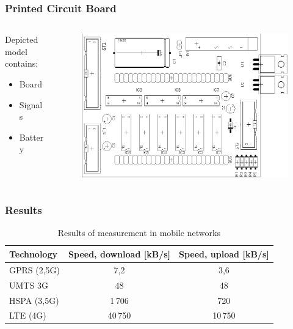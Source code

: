 \documentclass[%
  12pt,       				%
	t,                  %
	aspectratio=1610,   %
	unicode,						%
]{beamer}				    	%
\begin{document}
\begin{frame} 
	\frametitle{Printed Circuit Board}
	
	\begin{columns}[T] 								%
		\begin{column}{0.4\textwidth}		%
			Depicted model contains:\\[2ex]
			\begin{itemize}
				\item Board
				\item Signals
				\item Battery
			\end{itemize}
		\end{column}
		\begin{column}{0.6\textwidth}		%
			\begin{figure}%
				\centering
				\vspace{1cm}	              %
				\includegraphics[width=0.8\columnwidth]{pict/soucastky}
			\end{figure}
		\end{column}
	\end{columns}											%
\end{frame}


\begin{frame} 
	\frametitle{Results}
	\vspace{1cm}
	\begin{table}[]
		\centering
		\caption{Results of measurement in mobile networks}
		\label{tab:table.results}
			\begin{tabular}{lcc}
				\toprule
					Technology  & Speed, download [kB/s] & Speed, upload [kB/s] \\
				\midrule
					GPRS (2,5G)	& 7,2 	& 3,6\\
					UMTS 3G     & 48 		& 48\\
					HSPA (3,5G)	&	1\,706	&	720\\
					LTE (4G) 		& 40\,750 & 10\,750\\
				\bottomrule                                       
			\end{tabular}
	\end{table}
\end{frame}
\end{document}
